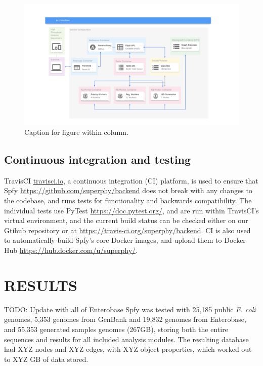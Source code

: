 \documentclass[a4,center,fleqn]{NAR}
\begin{document}
\begin{figure}[t]
\begin{center}
\includegraphics{images/docker.svg}
\end{center}
\caption{Caption for figure within column.}
\label{fig-docker}
\end{figure}

\subsection{Continuous integration and testing}

TravisCI \url{travisci.io}, a continuous integration (CI) platform, is used to ensure that Spfy \url{https://github.com/superphy/backend} does not break with any changes to the codebase, and runs tests for functionality and backwards compatibility.
The individual tests use PyTest \url{https://doc.pytest.org/}, and are run within TravisCI's virtual environment, and the current build status can be checked either on our Gtihub repository or at \url{https://travis-ci.org/superphy/backend}.
CI is also used to automatically build Spfy's core Docker images, and upload them to Docker Hub \url{https://hub.docker.com/u/superphy/}.

\section{RESULTS}
TODO: Update with all of Enterobase
Spfy was tested with 25,185 public \textit{E. coli} genomes, 5,353 genomes from GenBank and 19,832 genomes from Enterobase, and 55,353 generated samples genomes (267GB), storing both the entire sequences and results for all included analysis modules.
The resulting database had XYZ nodes and XYZ edges, with XYZ object properties, which worked out to XYZ GB of data stored.
\end{document}
